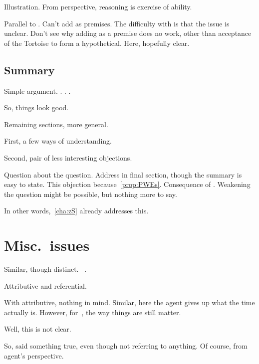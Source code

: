\begin{note}
  Illustration.
  From perspective, reasoning is exercise of ability.
\end{note}

\begin{note}
  {
    \color{green}
    Parallel to \citeauthor{Carroll:1895uj}.
    Can't add as premises.
    The difficulty with \citeauthor{Carroll:1895uj} is that the issue is unclear.
    Don't see why adding as a premise does no work, other than acceptance of the Tortoise to form a hypothetical.
    Here, hopefully clear.
  }
\end{note}

\subsection{Summary}
\label{sec:summary}

\begin{note}
  Simple argument.
  \ptivity{}.
  .
  \ptivity{}.

  So, things look good.
\end{note}

\begin{note}
  Remaining sections, more general.

  First, a few ways of understanding.

  Second, pair of less interesting objections.
\end{note}

\begin{note}
  Question about the question.
  Address in final section, though the summary is easy to state.
  This objection because~\autoref{prop:PWEs}.
  Consequence of \qzS{}.
  Weakening the question might be possible, but nothing more to say.

  In other words,~\autoref{cha:zS} already addresses this.
\end{note}


\newpage

\section{Misc.\ issues}
\label{cha:zSpA:sec:misc-issues}


\begin{note}
  Similar, though distinct.
  ~\cite{Donnellan:1966wt}.

  Attributive and referential.

  With attributive, nothing in mind.
  Similar, here the agent gives up what the time actually is.
  However, for~\citeauthor{Donnellan:1966wt}, the way things are still matter.

  Well, this is not clear.

  So, said something true, even though not referring to anything.
  Of course, from agent's perspective.
\end{note}

